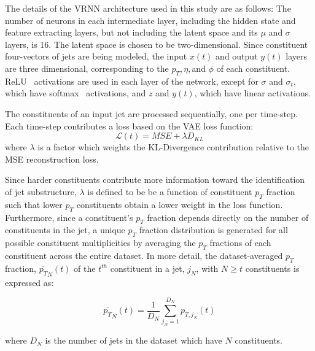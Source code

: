 \documentclass[12pt, a4paper]{article}
\begin{document}

The details of the VRNN architecture used in this study are as follows: The number of neurons in each intermediate layer, including the hidden state and feature extracting layers, but not including the latent space and its $\mu$ and $\sigma$ layers, is 16. The latent space is chosen to be two-dimensional. Since constituent four-vectors of jets are being modeled, the input $x(t)$ and output $y(t)$ layers are three dimensional, corresponding to the $p_{T}, \eta, $and $\phi$ of each constituent. ReLU~\cite{activations} activations are used in each layer of the network, except for $\sigma$ and $\sigma_{t}$, which have softmax~\cite{activations} activations, and $z$ and $y(t)$, which have linear activations. 

The constituents of an input jet are processed sequentially, one per time-step. 
Each time-step contributes a loss based on the VAE loss function: 
\begin{equation}
\mathcal{L}(t) = MSE + \lambda D_{KL}
\end{equation}
where $\lambda$ is a factor which weights the KL-Divergence contribution relative to the MSE reconstruction loss.

Since harder constituents contribute more information toward the identification of jet substructure, $\lambda$ is defined to be be a function of constituent $p_{T}$ fraction such that lower $p_{T}$ constituents obtain a lower weight in the loss function. 
Furthermore, since a constituent's $p_{T}$ fraction depends directly on the number of constituents in the jet, a unique $p_{T}$ fraction distribution is generated for all possible constituent multiplicities by averaging the $p_{T}$ fractions of each constituent across the entire dataset. In more detail, the dataset-averaged $p_{T}$ fraction, $\overline{p_{T}}_{N}(t)$ of the $t^{th}$ constituent in a jet, $j_{N}$, with $N \geq t$ constituents is expressed as:


\begin{equation}
\overline{p_{T}}_{N}(t)=\frac{1}{D_{N}}\displaystyle\sum_{j_{N} = 1}^{D_{N}} p_{T,j_{N}}(t)
\end{equation}

where $D_{N}$ is the number of jets in the dataset which have $N$ constituents.
\end{document}

